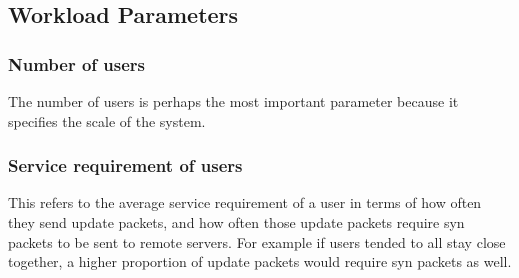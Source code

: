 \documentclass[12pt]{article}
\begin{document}
  \subsection{Workload Parameters}
    \subsubsection{Number of users}
The number of users is perhaps the most important parameter because it specifies
the scale of the system.
    \subsubsection{Service requirement of users}
This refers to the average service requirement of a user in terms of how often
they send update packets, and how often those update packets require syn packets
to be sent to remote servers.  For example if users tended to all stay close
together, a higher proportion of update packets would require syn packets as
well.
\end{document}
